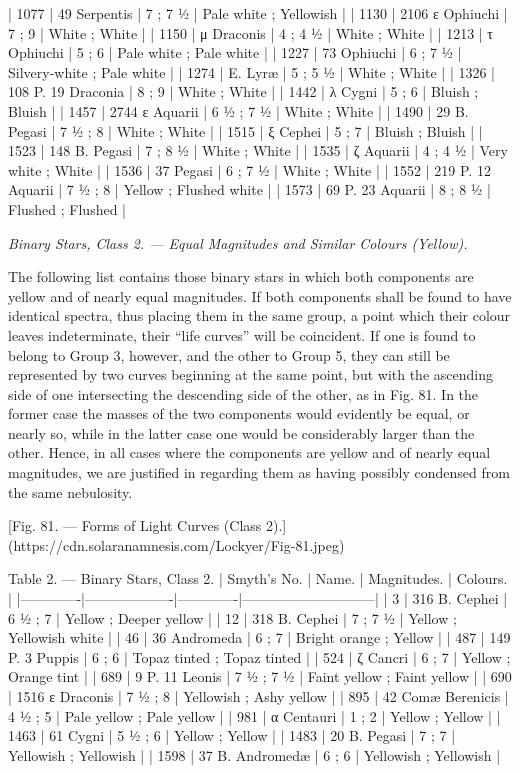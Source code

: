 \documentclass[a4paper, 12pt, oneside, polutonikogreek, english]{article}
\begin{document}
| 1077    | 49 Serpentis      | 7 ; 7 ½   | Pale white ; Yellowish     |
| 1130    | 2106 ε Ophiuchi    | 7 ; 9    | White ; White          |
| 1150    | μ Draconis       | 4 ; 4 ½   | White ; White          |
| 1213    | τ Ophiuchi       | 5 ; 6    | Pale white ; Pale white     |
| 1227    | 73 Ophiuchi      | 6 ; 7 ½   | Silvery-white ; Pale white   |
| 1274    | E. Lyræ        | 5 ; 5 ½   | White ; White          |
| 1326    | 108 P. 19 Draconia   | 8 ; 9    | White ; White          |
| 1442    | λ Cygni        | 5 ; 6    | Bluish ; Bluish         |
| 1457    | 2744 ε Aquarii     | 6 ½ ; 7 ½  | White ; White          |
| 1490    | 29 B. Pegasi      | 7 ½ ; 8   | White ; White          |
| 1515    | ξ Cephei        | 5 ; 7    | Bluish ; Bluish         |
| 1523    | 148 B. Pegasi     | 7 ; 8 ½   | White ; White          |
| 1535    | ζ Aquarii       | 4 ; 4 ½   | Very white ; White       |
| 1536    | 37 Pegasi       | 6 ; 7 ½   | White ; White          |
| 1552    | 219 P. 12 Aquarii   | 7 ½ ; 8   | Yellow ; Flushed white     |
| 1573    | 69 P. 23 Aquarii    | 8 ; 8 ½   | Flushed ; Flushed        |

\emph{Binary Stars, Class 2. --- Equal Magnitudes and Similar Colours (Yellow).}

The following list contains those binary stars in which both components are yellow and of nearly equal magnitudes. If both components shall be found to have identical spectra, thus placing them in the same group, a point which their colour leaves indeterminate, their ``life curves'' will be coincident. If one is found to belong to Group 3, however, and the other to Group 5, they can still be represented by two curves beginning at the same point, but with the ascending side of one intersecting the descending side of the other, as in Fig. 81. In the former case the masses of the two components would evidently be equal, or nearly so, while in the latter case one would be considerably larger than the other. Hence, in all cases where the components are yellow and of nearly equal magnitudes, we are justified in regarding them as having possibly condensed from the same nebulosity.

[Fig. 81. --- Forms of Light Curves (Class 2).](https://cdn.solaranamnesis.com/Lockyer/Fig-81.jpeg)

Table 2. --- Binary Stars, Class 2. 
| Smyth’s No. | Name.       | Magnitudes. | Colours.          |
|-------------|-------------------|-------------|-----------------------------|
| 3      | 316 B. Cephei   | 6 ½ ; 7   | Yellow ; Deeper yellow   |
| 12     | 318 B. Cephei   | 7 ; 7 ½   | Yellow ; Yellowish white  |
| 46     | 36 Andromeda   | 6 ; 7    | Bright orange ; Yellow   |
| 487     | 149 P. 3 Puppis  | 6 ; 6    | Topaz tinted ; Topaz tinted |
| 524     | ζ Cancri     | 6 ; 7    | Yellow ; Orange tint    |
| 689     | 9 P. 11 Leonis  | 7 ½ ; 7 ½  | Faint yellow ; Faint yellow |
| 690     | 1516 ε Draconis  | 7 ½ ; 8   | Yellowish ; Ashy yellow   |
| 895     | 42 Comæ Berenicis | 4 ½ ; 5   | Pale yellow ; Pale yellow  |
| 981     | α Centauri    | 1 ; 2    | Yellow ; Yellow       |
| 1463    | 61 Cygni     | 5 ½ ; 6   | Yellow ; Yellow       |
| 1483    | 20 B. Pegasi   | 7 ; 7    | Yellowish ; Yellowish    |
| 1598    | 37 B. Andromedæ  | 6 ; 6    | Yellowish ; Yellowish    |
\end{document}
